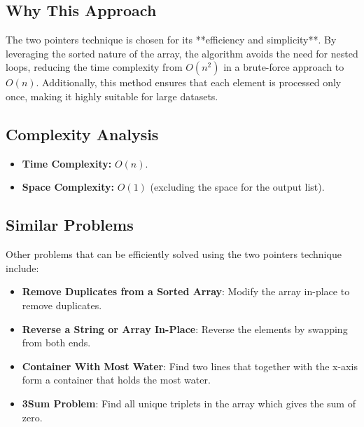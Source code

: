 \subsection*{Why This Approach}

The two pointers technique is chosen for its **efficiency and simplicity**. By leveraging the sorted nature of the array, the algorithm avoids the need for nested loops, reducing the time complexity from \(O(n^2)\) in a brute-force approach to \(O(n)\). Additionally, this method ensures that each element is processed only once, making it highly suitable for large datasets.

\subsection*{Complexity Analysis}
\begin{itemize}
    \item \textbf{Time Complexity:} \(O(n)\).
    \item \textbf{Space Complexity:} \(O(1)\) (excluding the space for the output list).
\end{itemize}

\subsection*{Similar Problems}
Other problems that can be efficiently solved using the two pointers technique include:
\begin{itemize}
    \item \textbf{Remove Duplicates from a Sorted Array}: Modify the array in-place to remove duplicates.
    \item \textbf{Reverse a String or Array In-Place}: Reverse the elements by swapping from both ends.
    \item \textbf{Container With Most Water}: Find two lines that together with the x-axis form a container that holds the most water.
    \item \textbf{3Sum Problem}: Find all unique triplets in the array which gives the sum of zero.
\end{itemize}

